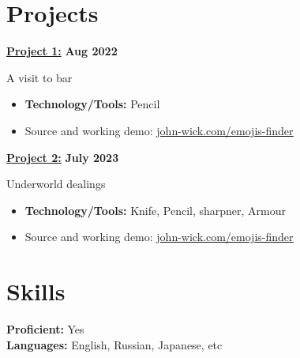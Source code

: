 \documentclass[letterpaper, 11pt]{article}
\newcommand{\bulletSpace}{\vspace{-8pt}}
\newcommand{\secStartSpace}{\vspace{3pt}}
\newcommand{\secEndSpace}{\vspace{5pt}}
\newcommand{\spaceCollapse}{\vspace{-5pt}}
\begin{document}
\section{\color{red} \textbf{Projects}}
\secStartSpace

\begin{addmargin}[1em]{1em}
		
	\noindent\href{https://github.com/john-wick}{\textbf{Project 1:}}  \hfill \textbf{Aug 2022} 
		
	\noindent A visit to bar
	\spaceCollapse
	\begin{itemize}
		\item \textbf{Technology/Tools:} Pencil
		      \bulletSpace
		\item Source and working demo:  \href{https://github.com/john-wick}{\underline{john-wick.com/emojis-finder}}
	\end{itemize}
	
	\noindent\href{https://github.com/john-wick}{\textbf{Project 2:}}  \hfill \textbf{July 2023} 
		
	\noindent Underworld dealings
	\spaceCollapse
	\begin{itemize}
		\item \textbf{Technology/Tools:} Knife, Pencil, sharpner, Armour
		      \bulletSpace
		\item Source and working demo:  \href{https://github.com/john-wick}{\underline{john-wick.com/emojis-finder}}
	\end{itemize}
		
		
\end{addmargin}
\secEndSpace


\section{\color{red} \textbf{Skills}}
\secStartSpace

\begin{addmargin}[1em]{1em}
	\noindent \textbf{Proficient:} Yes \\
	\noindent \textbf{Languages:} English, Russian, Japanese, etc \\
\end{addmargin}
\secEndSpace
\end{document}
